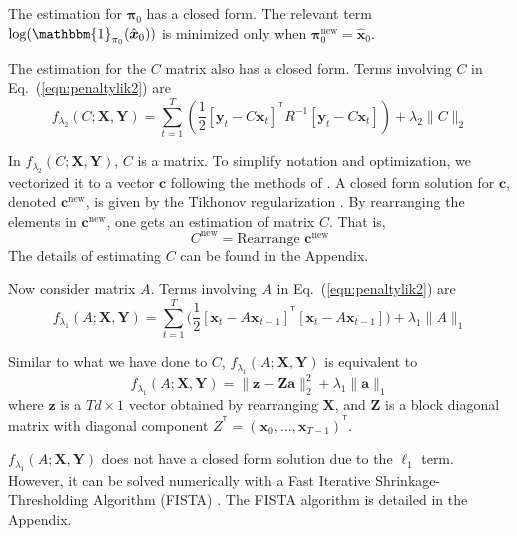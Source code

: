 \documentclass[fleqn,12pt]{article}
\let\oldref\ref
\renewcommand{\ref}[1]{(\oldref{#1})}
\newcommand{\T}{^{\ensuremath{\mathsf{T}}}}           %
\providecommand{\mb}[1]{\boldsymbol{#1}}
\newcommand{\bx}{\mb{x}}
\newcommand{\by}{\mb{y}}
\newcommand{\bX}{\mb{X}}
\newcommand{\bY}{\mb{Y}}
\begin{document}
The estimation for $\mathbf{\pi}_0$ has a closed form. The relevant term $\log(\mathbbm{1}_{\mathbf{\pi}_0}(\hat{\bx}_0))$ is minimized only when $\mathbf{\pi}_0^{\text{new}} = \hat{\bx}_0$.

The estimation for the $C$ matrix also has a closed form. Terms involving $C$ in Eq.~\ref{eqn:penaltylik2} are
\begin{equation*}
f_{\lambda_2}(C;\bX,\bY) = \sum\limits_{t=1}^{T}\left(\frac{1}{2}[\by_t-C\bx_t]^{\T}R^{-1}[\by_t-C\bx_t]\right)+\lambda_2 \|C\|_2
\end{equation*}

In $f_{\lambda_2}(C;\bX,\bY)$, $C$ is a matrix. To simplify notation and optimization, we vectorized it to a vector $\mathbf{c}$ following the methods of \citet{turlach2005simultaneous}. A closed form solution for $\mathbf{c}$, denoted $\mathbf{c}^{\text{new}}$, is given by the Tikhonov regularization \citep{tikhonov1943stability}. By rearranging the elements in $\mathbf{c}^{\text{new}}$, one gets an estimation of matrix $C$. That is,
\begin{equation}\label{eq:updatec}
C^{\text{new}} =\text{Rearrange } \mathbf{c}^{\text{new}}
\end{equation}
The details of estimating $C$ can be found in the Appendix.

Now consider matrix $A$. Terms involving $A$ in Eq.~\ref{eqn:penaltylik2} are
\begin{equation*}
f_{\lambda_1}(A;\bX,\bY) = \sum\limits_{t=1}^{T}\big(\frac{1}{2}[\bx_t-A\bx_{t-1}]^{\T}[\bx_t-A\bx_{t-1}]\big)+\lambda_1 \|A\|_1
\end{equation*}

Similar to what we have done to $C$, $f_{\lambda_1}(A;\bX,\bY)$ is equivalent to
\begin{equation*}
f_{\lambda_1}(A;\bX,\bY) =  \|\mathbf{z}  - \mathbf{Za}\|_2^2 + \lambda_1\|\mathbf{a}\|_1
\end{equation*}
where $\mathbf{z}$ is a $Td \times 1$ vector obtained by rearranging $\bX$, and $\mathbf{Z}$ is a block diagonal matrix with diagonal component $Z^{\T} =(\bx_0,\ldots,\bx_{T-1})^{\T}$.
%
%
%
%
%


$f_{\lambda_1}(A;\bX,\bY)$ does not have a closed form solution due to the $\ell_1$ term. However, it can be solved numerically with a Fast Iterative Shrinkage-Thresholding Algorithm (FISTA) \citep{beck2009fast}. The FISTA algorithm is detailed in the Appendix.
\end{document}
